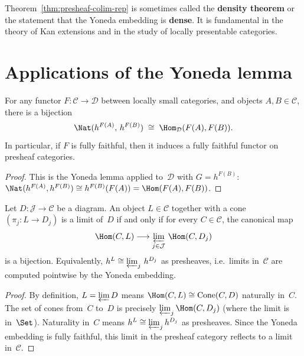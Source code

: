 \begin{remark}\label{rem:density}
Theorem~\ref{thm:presheaf-colim-rep} is sometimes called the
\textbf{density theorem} or the statement that the Yoneda embedding
is \textbf{dense}.  It is fundamental in the theory of Kan extensions
and in the study of locally presentable categories.
\end{remark}


\section{Applications of the Yoneda lemma}\label{sec:yoneda-applications}

\begin{proposition}%
\label{prop:nat-trans-representable}
For any functor $F\colon\mathcal{C}\to\mathcal{D}$ between locally small
categories, and objects $A,B\in\mathcal{C}$, there is a bijection
\[
    \Nat(h^{F(A)},\, h^{F(B)}) \;\cong\; \Hom_{\mathcal{D}}(F(A),F(B)).
\]
In particular, if $F$ is fully faithful, then it induces a fully faithful
functor on presheaf categories.
\end{proposition}

\begin{proof}
This is the Yoneda lemma applied to~$\mathcal{D}$ with
$G = h^{F(B)}$:
$\Nat(h^{F(A)},h^{F(B)})\cong h^{F(B)}(F(A)) = \Hom(F(A),F(B))$.
\end{proof}

\begin{proposition}%
\label{prop:limit-representable}
Let $D\colon\mathcal{J}\to\mathcal{C}$ be a diagram.  An object
$L\in\mathcal{C}$ together with a cone $(\pi_j\colon L\to D_j)$ is a
limit of~$D$ if and only if for every $C\in\mathcal{C}$, the canonical map
\[
    \Hom(C,L) \longrightarrow \varprojlim_{j\in\mathcal{J}}\,\Hom(C,D_j)
\]
is a bijection.  Equivalently, $h^L\cong\varprojlim_j\, h^{D_j}$
as presheaves, i.e.\ limits in~$\mathcal{C}$ are computed pointwise
by the Yoneda embedding.
\end{proposition}

\begin{proof}
By definition, $L = \varprojlim D$ means
$\Hom(C,L)\cong\mathrm{Cone}(C,D)$ naturally in~$C$.
The set of cones from~$C$ to~$D$ is precisely
$\varprojlim_j\Hom(C,D_j)$ (where the limit is in~$\Set$).
Naturality in~$C$ means $h^L\cong\varprojlim_j h^{D_j}$ as presheaves.
Since the Yoneda embedding is fully faithful, this limit in the
presheaf category reflects to a limit in~$\mathcal{C}$.
\end{proof}


